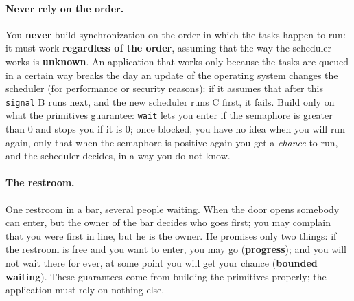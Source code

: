 \paragraph{Never rely on the order.} You \textbf{never} build synchronization on the order in which the tasks happen to run: it must work \textbf{regardless of the order}, assuming that the way the scheduler works is \textbf{unknown}. An application that works only because the tasks are queued in a certain way breaks the day an update of the operating system changes the scheduler (for performance or security reasons): if it assumes that after this \texttt{signal} B runs next, and the new scheduler runs C first, it fails. Build only on what the primitives guarantee: \texttt{wait} lets you enter if the semaphore is greater than 0 and stops you if it is 0; once blocked, you have no idea when you will run again, only that when the semaphore is positive again you get a \emph{chance} to run, and the scheduler decides, in a way you do not know.

\paragraph{The restroom.} One restroom in a bar, several people waiting. When the door opens somebody can enter, but the owner of the bar decides who goes first; you may complain that you were first in line, but he is the owner. He promises only two things: if the restroom is free and you want to enter, you may go (\textbf{progress}); and you will not wait there for ever, at some point you will get your chance (\textbf{bounded waiting}). These guarantees come from building the primitives properly; the application must rely on nothing else.

